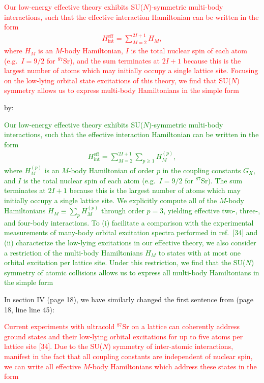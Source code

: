 \documentclass[preprint]{revtex4-1}
\renewcommand{\t}{\text} %
\newcommand{\1}{\mathds{1}}
\newcommand{\red}[1]{\textcolor{red}{#1}}
\newcommand{\green}[1]{\textcolor{green}{#1}}
\begin{document}
\begin{enumerate}
  \red{Our low-energy effective theory exhibits SU($N$)-symmetric
    multi-body interactions, such that the effective interaction
    Hamiltonian can be written in the form
    \begin{align*}
      H_{\t{int}}^{\t{eff}} = \sum_{M=2}^{2I+1} H_M, \tag{9}
    \end{align*}
    where $H_M$ is an $M$-body Hamiltonian, $I$ is the total nuclear
    spin of each atom (e.g.~$I=9/2$ for ${}^{87}$Sr), and the sum
    terminates at $2I+1$ because this is the largest number of atoms
    which may initially occupy a single lattice site.  Focusing on the
    low-lying orbital state excitations of this theory, we find that
    SU($N$) symmetry allows us to express multi-body Hamiltonians in
    the simple form}

  by:

  \green{Our low-energy effective theory exhibits SU($N$)-symmetric
    multi-body interactions, such that the effective interaction
    Hamiltonian can be written in the form
    \begin{align*}
      H_{\t{int}}^{\t{eff}} = \sum_{M=2}^{2I+1} \sum_{p\ge1} H_M^{(p)},
      \tag{9}
    \end{align*}
    where $H_M^{(p)}$ is an $M$-body Hamiltonian of order $p$ in the
    coupling constants $G_X$, and $I$ is the total nuclear spin of
    each atom (e.g.~$I=9/2$ for ${}^{87}$Sr).  The sum terminates at
    $2I+1$ because this is the largest number of atoms which may
    initially occupy a single lattice site.  We explicitly compute all
    of the $M$-body Hamiltonians $H_M\equiv\sum_p H_M^{(p)}$ through
    order $p=3$, yielding effective two-, three-, and four-body
    interactions.  To (i) facilitate a comparison with the
    experimental measurements of many-body orbital excitation spectra
    performed in ref.~[34] and (ii) characterize the low-lying
    excitations in our effective theory, we also consider a
    restriction of the multi-body Hamiltonians $H_M$ to states with at
    most one orbital excitation per lattice site.  Under this
    restriction, we find that the SU($N$) symmetry of atomic
    collisions allows us to express all multi-body Hamiltonians in the
    simple form}

  In section IV (page 18), we have similarly changed the first
  sentence from (page 18, line line 45):

  \red{Current experiments with ultracold ${}^{87}$Sr on a lattice can
    coherently address ground states and their low-lying orbital
    excitations for up to five atoms per lattice site [34].  Due to
    the SU($N$) symmetry of inter-atomic interactions, manifest in the
    fact that all coupling constants are independent of nuclear spin,
    we can write all effective $M$-body Hamiltonians which address
    these states in the form}


\end{enumerate}
\end{document}
